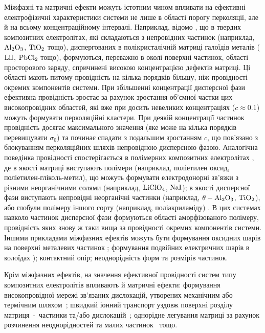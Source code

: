 \documentclass[14pt,twoside]{vakthesis}
\begin{document}
Міжфазні та матричні ефекти можуть істотним чином впливати на ефективні електрофізичні характеристики системи не лише в області порогу перколяції, але й на всьому концентраційному інтервалі.
Наприклад, відомо \cite{Maier1986, Nan1993}, що в твердих композитних електролітах, які складаються з непровідних частинок (наприклад, $\rm Al_2O_3$, $\rm TiO_2$ тощо), диспергованих в полікристалічній матриці галоїдів металів ($\rm LiI$, $\rm PbCl_2$ тощо), формуються, переважно в околі поверхні частинок, області просторового заряду, спричинені високою концентрацією  дефектів  матриці. Ці області мають питому провідність на кілька порядків більшу, ніж провідності окремих компонентів системи. При збільшенні концентрації дисперсної фази ефективна провідність зростає за рахунок зростання об'ємної частки цих високопровідних областей, які вже при досить невеликих концентраціях ($c\approx0.1$) можуть формувати перколяційні кластери. При деякій концентрації частинок провідність досягає максимального значення (яке може на кілька порядків перевищувати $\sigma_0$) та починає спадати з подальшим зростанням $c$, що пов'язано з блокуванням перколяційних шляхів непровідною дисперсною фазою. 
Аналогічна поведінка провідності спостерігається в полімерних композитних електролітах \cite{Wiec1994,nanocomp2008,sequera2010}, де в якості матриці виступають полімери (наприклад, поліетилен оксид, поліетилен-гліколь-метил), що можуть формувати електродонорні зв'язки з різними неорганічними солями (наприклад, $\rm LiClO_4$, $\rm NaI$); в якості дисперсної фази виступають непровідні неорганічні частинки (наприклад, $\rm \theta-Al_2O_3$, $\rm TiO_2$), або глобули полімеру іншого сорту (наприклад, поліакриламіду) \cite{nanocomp2008}. В цих системах навколо частинок дисперсної фази формуються області аморфізованого полімеру,  провідність яких знову ж таки вища за провідності окремих компонентів системи.
Іншими прикладами міжфазних ефектів можуть бути формування оксидних шарів на поверхні металевих частинок \cite{ChenI.-G.1986,Grannan1981}; формування подвійних електричних шарів в колоїдах \cite{Ohshima1982}); контактний опір; неоднорідність форм та розмірів частинок.

Крім міжфазних ефектів, на значення ефективної провідності систем типу композитних електролітів впливають й матричні ефекти: формування високопровідної мережі зв'язаних дислокацій, утворених механічним або термічним шляхом~\cite{Dudney1987, Dudney1988, Muhlherr1988}; швидкий іонний транспорт уздовж поверхні розділу матриця~-~частинки та/або дислокацій~\cite{Phipps1981, Atkinson1988}; однорідне легування матриці за рахунок розчинення неоднорідностей та малих частинок~\cite{Wen1983, Dupree1983, Dudney1985} тощо.
\end{document}

